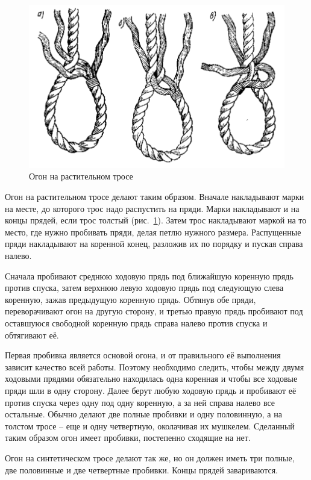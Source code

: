 \documentclass[a4paper, 12pt, twoside, final]{scrbook}
\begin{document}
\begin{figure}[htbp]
   \centering
   \includegraphics{66_Ogon_na_rast_trose} %
   \caption{Огон на растительном тросе}
   \label{fig:66}
\end{figure}

Огон на растительном тросе делают таким образом. Вначале накладывают марки на месте, до которого трос надо распустить на пряди. Марки накладывают и на концы прядей, если трос толстый (рис.~\ref{fig:66}). Затем трос накладывают маркой на то место, где нужно пробивать пряди, делая петлю нужного размера. Распущенные пряди накладывают на коренной конец, разложив их по порядку и пуская справа налево.

Сначала пробивают среднюю ходовую прядь под ближайшую коренную прядь против спуска, затем верхнюю левую ходовую прядь под следующую слева коренную, зажав предыдущую коренную прядь. Обтянув обе пряди, переворачивают огон на другую сторону, и третью правую прядь пробивают под оставшуюся свободной коренную прядь справа налево против спуска и обтягивают её.

Первая пробивка является основой огона, и от правильного её выполнения зависит качество всей работы. Поэтому необходимо следить, чтобы между двумя ходовыми прядями обязательно находилась одна коренная и чтобы все ходовые пряди шли в одну сторону. Далее берут любую ходовую прядь и пробивают её против спуска через одну под одну коренную, а за ней справа налево все остальные. Обычно делают две полные пробивки и одну половинную, а на толстом тросе \--- еще и одну четвертную, околачивая их мушкелем. Сделанный таким образом огон имеет пробивки, постепенно сходящие на нет.

Огон на синтетическом тросе делают так же, но он должен иметь три полные, две половинные и две четвертные пробивки. Концы прядей завариваются.
\end{document}
